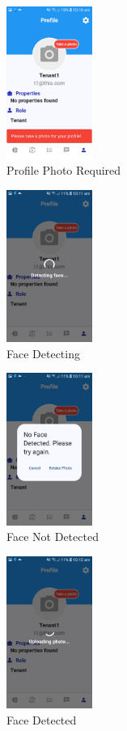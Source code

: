 \documentclass[sigconf,nonacm]{acmart}\settopmatter{printfolios=true}
\begin{document}
\begin{figure}[htbp]
  \centering
  \includegraphics[width=0.25\textwidth]{RequireProfilePhoto.jpg}
  \caption{Profile Photo Required}
  \label{fig:RequireProfilePhoto}
\end{figure}
\begin{figure}[htbp]
  \centering
  \includegraphics[width=0.25\textwidth]{faceDetecting.jpg}
  \caption{Face Detecting}
  \label{fig:faceDetecting}
\end{figure}
\begin{figure}[htbp]
  \centering
  \includegraphics[width=0.25\textwidth]{faceCheckFailed.jpg}
  \caption{Face Not Detected}
  \label{fig:noFace}
\end{figure}
\begin{figure}[htbp]
  \centering
  \includegraphics[width=0.25\textwidth]{faceCheckSuccess.jpg}
  \caption{Face Detected}
  \label{fig:faceCheckSuccess}
\end{figure}
\end{document}
